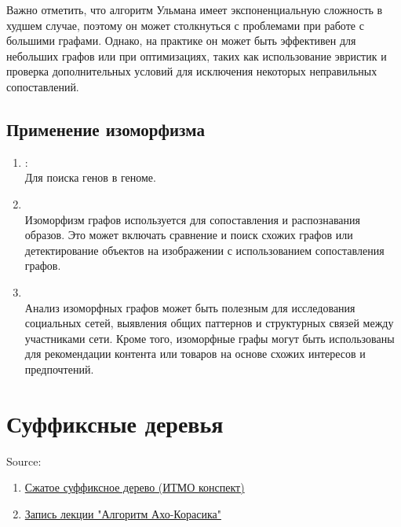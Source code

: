         Важно отметить, что алгоритм Ульмана имеет экспоненциальную сложность в худшем случае, поэтому он может столкнуться с проблемами при работе с большими графами. Однако, на практике он может быть эффективен для небольших графов или при оптимизациях, таких как использование эвристик и проверка дополнительных условий для исключения некоторых неправильных сопоставлений.
    
    \subsection{Применение изоморфизма}
    \begin{enumerate}
        \item {}:\\ 
        Для поиска генов в геноме.
        \item {}\\
        Изоморфизм графов используется для сопоставления и распознавания образов. Это может включать сравнение и поиск схожих графов или детектирование объектов на изображении с использованием сопоставления графов.
        \item {}\\
        Анализ изоморфных графов может быть полезным для исследования социальных сетей, выявления общих паттернов и структурных связей между участниками сети. Кроме того, изоморфные графы могут быть использованы для рекомендации контента или товаров на основе схожих интересов и предпочтений.
    \end{enumerate}

\section{Суффиксные деревья}
Source:
\begin{enumerate}
    \item \href{https://neerc.ifmo.ru/wiki/index.php?title=%D0%A1%D0%B6%D0%B0%D1%82%D0%BE%D0%B5_%D1%81%D1%83%D1%84%D1%84%D0%B8%D0%BA%D1%81%D0%BD%D0%BE%D0%B5_%D0%B4%D0%B5%D1%80%D0%B5%D0%B2%D0%BE}{Сжатое суффиксное дерево (ИТМО конспект)}
    \item \href{https://vec.etu.ru/moodle/mod/resource/view.php?id=155087}{Запись лекции "Алгоритм Ахо-Корасика"}
\end{enumerate}

